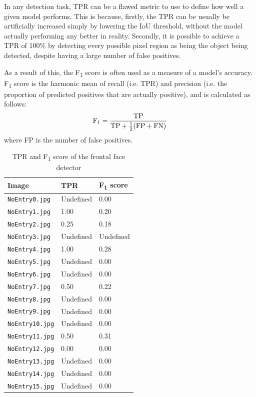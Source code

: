 \documentclass[twocolumn, 10pt, a4paper]{article}
\begin{document}
In any detection task, TPR can be a flawed metric to use to define how well a given model performs.
This is because, firstly, the TPR can be usually be artificially increased simply by lowering the IoU threshold, without the model actually performing any better in reality.
Secondly, it is possible to achieve a TPR of 100\% by detecting every possible pixel region as being the object being detected, despite having a large number of false positives.

As a result of this, the F\textsubscript{1} score is often used as a measure of a model's accuracy.
F\textsubscript{1} score is the harmonic mean of recall (i.e. TPR) and precision (i.e. the proportion of predicted positives that are actually positive), and is calculated as follows:
\[
  \textrm{F\textsubscript{1}} = \frac{\textrm{TP}}{\textrm{TP} + \frac{1}{2}(\textrm{FP} + \textrm{FN})}
\]
where FP is the number of false positives. 

\begin{table}[htbp]
  \begin{center}
  \caption{TPR and F\textsubscript{1} score of the frontal face detector}\label{tab:face}
  \begin{tabular}{l | l l} 
    \hline\hline
    Image&TPR&F\textsubscript{1} score\\
    \hline
    \texttt{NoEntry0.jpg}&Undefined&0.00\\ 
    \texttt{NoEntry1.jpg}&1.00&0.20\\ 
    \texttt{NoEntry2.jpg}&0.25&0.18\\ 
    \texttt{NoEntry3.jpg}&Undefined&Undefined\\ 
    \texttt{NoEntry4.jpg}&1.00&0.28\\ 
    \texttt{NoEntry5.jpg}&Undefined&0.00\\ 
    \texttt{NoEntry6.jpg}&Undefined&0.00\\ 
    \texttt{NoEntry7.jpg}&0.50&0.22\\ 
    \texttt{NoEntry8.jpg}&Undefined&0.00\\ 
    \texttt{NoEntry9.jpg}&Undefined&0.00\\ 
    \texttt{NoEntry10.jpg}&Undefined&0.00\\ 
    \texttt{NoEntry11.jpg}&0.50&0.31\\ 
    \texttt{NoEntry12.jpg}&0.00&0.00\\ 
    \texttt{NoEntry13.jpg}&Undefined&0.00\\ 
    \texttt{NoEntry14.jpg}&Undefined&0.00\\ 
    \texttt{NoEntry15.jpg}&Undefined&0.00\\ 
    \hline
  \end{tabular}
  \end{center}
\end{table} 
\end{document}
